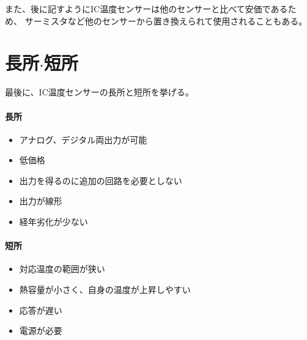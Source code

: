 \documentclass[twocolumn]{jsarticle}
\begin{document}
    また、後に記すようにIC温度センサーは他のセンサーと比べて安価であるため、
    サーミスタなど他のセンサーから置き換えられて使用されることもある。

\section{長所$\cdot$短所}
    最後に、IC温度センサーの長所と短所を挙げる。

    \paragraph{長所}
        \begin{itemize}
            \item アナログ、デジタル両出力が可能
            \item 低価格
            \item 出力を得るのに追加の回路を必要としない
            \item 出力が線形
            \item 経年劣化が少ない
        \end{itemize}

    \paragraph{短所}
        \begin{itemize}
            \item 対応温度の範囲が狭い
            \item 熱容量が小さく、自身の温度が上昇しやすい
            \item 応答が遅い
            \item 電源が必要
        \end{itemize}
\end{document}
